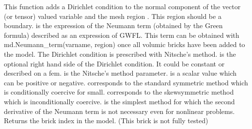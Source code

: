 \documentclass[a4paper,11pt,english]{sphinxmanual}
\begin{document}
This function adds a Dirichlet condition to the normal component of the vector
(or tensor) valued variable  and the mesh region .
This region should be a boundary. 
is the expression of the Neumann term (obtained by the Green formula)
described as an expression of GWFL. This term can be obtained with
md.Neumann\_term(varname, region) once all volumic bricks have
been added to the model. The Dirichlet
condition is prescribed with Nitsche’s method.  is the optional
right hand side of the Dirichlet condition. It could be constant or
described on a fem.  is the
Nitsche’s method parameter.  is a scalar value which can be
positive or negative.  corresponds to the standard symmetric
method which is conditionally coercive for   small.
 corresponds to the skew\sphinxhyphen{}symmetric method which is
inconditionally coercive.  is the simplest method
for which the second derivative of the Neumann term is not necessary
even for nonlinear problems. Returns the brick index in the model.
(This brick is not fully tested)

\begin{sphinxVerbatim}[commandchars=\\\{\}]
          
      
          
         
\end{sphinxVerbatim}
\end{document}
